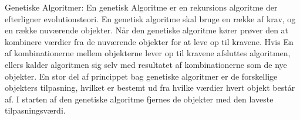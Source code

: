Genetiske Algoritmer:
En genetisk Algoritme er en rekursions algoritme der efterligner evolutionsteori. En genetisk algoritme skal bruge en række af krav, og en række nuværende objekter.
Når den genetiske algoritme kører prøver den at kombinere værdier fra de nuværende objekter for at leve op til kravene. Hvis En af kombinationerne mellem objekterne lever op til kravene afsluttes algoritmen, ellers kalder algoritmen sig selv med resultatet af kombinationerne som de nye objekter.
En stor del af princippet bag genetiske algoritmer er de forskellige objekters tilpasning, hvilket er bestemt ud fra hvilke værdier hvert objekt består af. I starten af den genetiske algoritme fjernes de objekter med den laveste tilpasningsværdi.